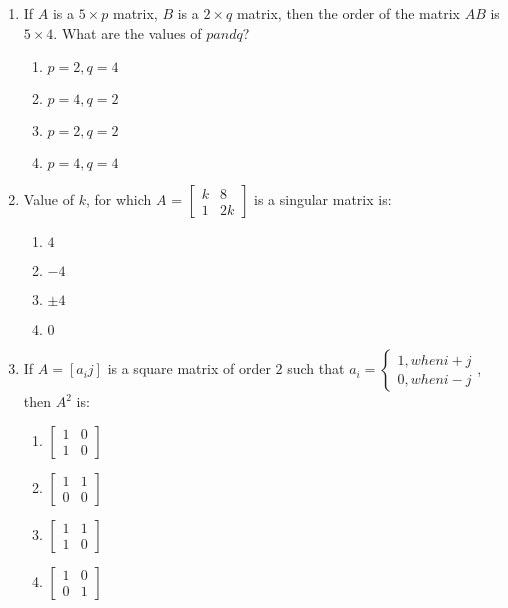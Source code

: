\documentclass{article}
\begin{document}
\begin{enumerate}
   \item If $A$ is a $5 \times p$ matrix, $B$ is a $2 \times q$ matrix, then the order of the matrix $AB$ is $5 \times 4$. What are the values of $p and q$?
   \begin{enumerate}
       \item $p = 2, q = 4$
       \item $p = 4, q = 2$
       \item $p = 2, q = 2$
       \item $p = 4, q = 4$
   \end{enumerate}

   \item Value of $k$, for which $A$ = $\begin{bmatrix}
        k & 8\\
        1 & 2k
        \end{bmatrix}$ is a singular matrix is:
    \begin{enumerate}
        \item $4$
        \item $-4$
        \item $\pm 4$
        \item $0$
    \end{enumerate}
        

    \item If $A = [a_{i}{j}]$ is a square matrix of order $2$ such that $a_{i}= \begin{cases}1, when i + j\\
    0, when i-j
    \end{cases}$, then $A^2$ is:
    
    \begin{enumerate}
        \item $\begin{bmatrix}
            1 & 0\\
            1 & 0
        \end{bmatrix}$
        \item $\begin{bmatrix}
            1 & 1\\
            0 & 0
        \end{bmatrix}$
        \item $\begin{bmatrix}
            1 & 1\\
            1 & 0
        \end{bmatrix}$
        \item $\begin{bmatrix}
            1 & 0\\
            0 & 1
        \end{bmatrix}$
    \end{enumerate}


\end{enumerate}
\end{document}
